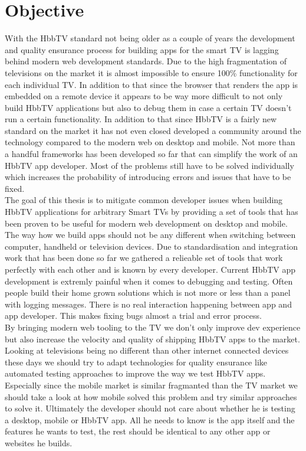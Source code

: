 \section{Objective\label{sec:objective}}

With the HbbTV standard not being older as a couple of years the development and quality ensurance process for
building apps for the smart TV is lagging behind modern web development standards. Due to the high fragmentation
of televisions on the market it is almost impossible to ensure 100\% functionality for each individual TV.
In addition to that since the browser that renders the app is embedded on a remote device it appears to be
way more difficult to not only build HbbTV applications but also to debug them in case a certain TV doesn't
run a certain functionality. In addition to that since HbbTV is a fairly new standard on the market it has not
even closed developed a community around the technology compared to the modern web on desktop and mobile. Not
more than a handful frameworks has been developed so far that can simplify the work of an HbbTV app developer. Most
of the problems still have to be solved individually which increases the probability of introducing errors and
issues that have to be fixed.\\
The goal of this thesis is to mitigate common developer issues when building HbbTV applications for arbitrary
Smart TVs by providing a set of tools that has been proven to be useful for modern web development on desktop
and mobile. The way how we build apps should not be any different when switching between computer, handheld or
television devices. Due to standardisation and integration work that has been done so far we gathered a relieable
set of tools that work perfectly with each other and is known by every developer. Current HbbTV app development
is extremly painful when it comes to debugging and testing. Often people build their home grown solutions
which is not more or less than a panel with logging messages. There is no real interaction happening between app
and app developer. This makes fixing bugs almost a trial and error process.\\
By bringing modern web tooling to the TV we don't only improve dev experience but also increase the velocity
and quality of shipping HbbTV apps to the market. Looking at televisions being no different than other internet
connected devices these days we should try to adapt technologies for quality ensurance like automated testing
approaches to improve the way we test HbbTV apps. Especially since the mobile market is similar fragmanted
than the TV market we should take a look at how mobile solved this problem and try similar approaches to solve
it. Ultimately the developer should not care about whether he is testing a desktop, mobile or HbbTV app. All
he needs to know is the app itself and the features he wants to test, the rest should be identical to any other
app or websites he builds.

